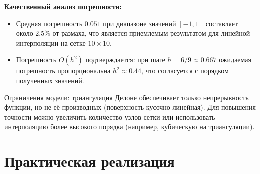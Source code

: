 \documentclass[a4paper, 14pt]{extarticle}
\begin{document}
\textbf{Качественный анализ погрешности:}

\begin{itemize}
  \item Средняя погрешность $0.051$ при диапазоне значений $[-1, 1]$ составляет около $2.5\%$ от размаха, что является приемлемым результатом для линейной интерполяции на сетке $10 \times 10$.
  \item Погрешность $O(h^2)$ подтверждается: при шаге $h = 6/9 \approx 0.667$ ожидаемая погрешность пропорциональна $h^2 \approx 0.44$, что согласуется с порядком полученных значений.
\end{itemize}

Ограничения модели: триангуляция Делоне обеспечивает только непрерывность функции, но не её производных (поверхность кусочно-линейная). Для повышения точности можно увеличить количество узлов сетки или использовать интерполяцию более высокого порядка (например, кубическую на триангуляции).

\section{Практическая реализация}
\end{document}

